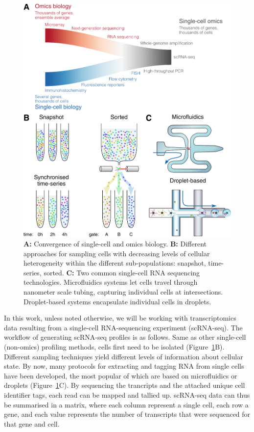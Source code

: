 \begin{figure}[htb!]
	\centering
	\includegraphics[width=.7\linewidth]{fig/scomics_2.pdf} 
	\caption{
		\textbf{A:} Convergence of single-cell and omics biology.
		\textbf{B:} Different approaches for sampling cells with decreasing levels of cellular heterogeneity within the different sub-populations: snapshot, time-series, sorted.
		\textbf{C:} Two common single-cell RNA sequencing technologies. Microfluidics systems let cells travel through nanometer scale tubing, capturing individual cells at intersections. Droplet-based systems encapsulate individual cells in droplets.
	}
	\label{fig:profiling_convergence}
\end{figure}


In this work, unless noted otherwise, we will be working with transcriptomics data resulting from a single-cell RNA-sequencing experiment (scRNA-seq). The workflow of generating scRNA-seq profiles is as follows. Same as other single-cell (non-omics) profiling methods, cells first need to be isolated (Figure~\ref{fig:profiling_convergence}B). Different sampling techniques yield different levels of information about cellular state. By now, many protocols for extracting and tagging RNA from single cells have been developed\cite{svensson_exponentialscalingsinglecell_2018}, the most popular of which are based on microfluidics or droplets (Figure~\ref{fig:profiling_convergence}C). By sequencing the trancripts and the attached unique cell identifier tags, each read can be mapped and tallied up. scRNA-seq data can thus be summarised in a matrix, where each column represent a single cell, each row a gene, and each value represents the number of transcripts that were sequenced for that gene and cell.

